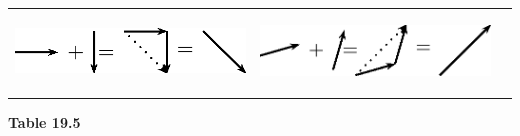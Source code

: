 \begin{center}
\begin{xtabular*}{\mytablewidth}[t]{|p{10\mystarwidth}|p{10\mystarwidth}|p{10\mystarwidth}|}
                  
    \setcounter{subfigure}{0}

\label{m38813*id188783}
    \begin{center}
    \label{m38813*id188783!!!underscore!!!media}\label{m38813*id188783!!!underscore!!!printimage}\includegraphics[width=300px]{col11305.imgs/m38813_PG11C1_027.png} %
        
      \vspace{2pt}
    \vspace{.1in}
    
    \end{center}



    \addtocounter{footnote}{-0}
    
                 &
    
    
        
                  
    \setcounter{subfigure}{0}

\label{m38813*id188793}
    \begin{center}
    \label{m38813*id188793!!!underscore!!!media}\label{m38813*id188793!!!underscore!!!printimage}\includegraphics[width=300px]{col11305.imgs/m38813_PG11C1_028.png} %
        
      \vspace{2pt}
    \vspace{.1in}
    
    \end{center}



    \addtocounter{footnote}{-0}
    
     \tabularnewline{}
    \end{xtabular*}
      \end{center}
    \begin{center}{\small\bfseries Table 19.5}\end{center}
    
